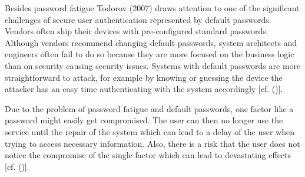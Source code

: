 Besides password fatigue Todorov (2007) draws attention to one of the significant challenges of secure user authentication represented by default passwords. Vendors often ship their devices with pre-configured standard passwords. Although vendors recommend changing default passwords, system architects and engineers often fail to do so because they are more focused on the business logic than on security causing security issues. Systems with default passwords are more straightforward to attack, for example by knowing or guessing the device the attacker has an easy time authenticating with the system accordingly [cf. (\cite{Todorov:2007:MUI})]. 


Due to the problem of password fatigue and default passwords, one factor like a password might easily get compromised. The user can then no longer use the service until the repair of the system which can lead to a delay of the user when trying to access necessary information. Also, there is a risk that the user does not notice the compromise of the single factor which can lead to devastating effects [cf. (\cite{Dasgupta:2017:AUA})]. 


